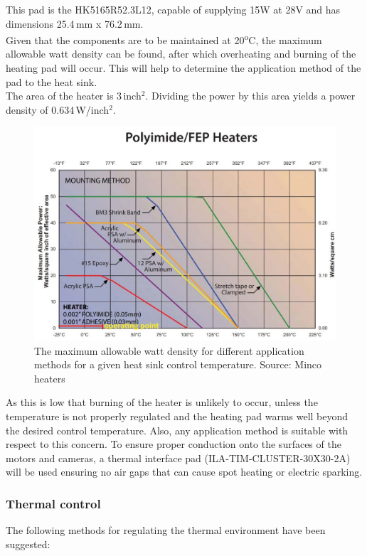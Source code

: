 This pad is the HK5165R52.3L12, capable of supplying 15W at 28V and has dimensions 25.4\,mm x 76.2\,mm.\\

Given that the components are to be maintained at 20\textsuperscript{o}C, the maximum allowable watt density can be found, after which overheating and burning of the heating pad will occur. This will help to determine the application method of the pad to the heat sink. \\

The area of the heater is 3\,inch$^2$. Dividing the power by this area yields a power density of 0.634\,W/inch$^2$.

	\begin{figure}[h!]
    \centering
    \includegraphics[scale=0.6]{4-experiment-design/img/mechanical/wattdensity.JPG}
	\caption{The maximum allowable watt density for different application methods for a given heat sink control temperature. Source: Minco heaters}
	\label{fig:thermalresistance1}
	\end{figure}

As this is low that burning of the heater is unlikely to occur, unless the temperature is not properly regulated and the heating pad warms well beyond the desired control temperature. Also, any application method is suitable with respect to this concern. To ensure proper conduction onto the surfaces of the motors and cameras, a thermal interface pad (ILA-TIM-CLUSTER-30X30-2A) will be used ensuring no air gaps that can cause spot heating or electric sparking. \\


\subsubsection{Thermal control}
The following methods for regulating the thermal environment have been suggested:\\

